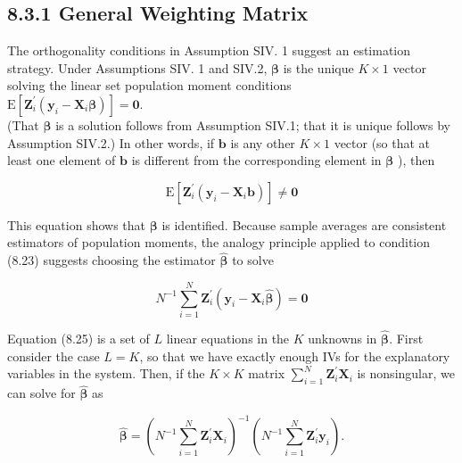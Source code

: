 \documentclass[10pt]{article}
\begin{document}
\subsection*{8.3.1 General Weighting Matrix}
The orthogonality conditions in Assumption SIV. 1 suggest an estimation strategy. Under Assumptions SIV. 1 and SIV.2, $\boldsymbol{\beta}$ is the unique $K \times 1$ vector solving the linear set population moment conditions\\
$\mathrm{E}\left[\mathbf{Z}_{i}^{\prime}\left(\mathbf{y}_{i}-\mathbf{X}_{i} \boldsymbol{\beta}\right)\right]=\mathbf{0}$.\\
(That $\boldsymbol{\beta}$ is a solution follows from Assumption SIV.1; that it is unique follows by Assumption SIV.2.) In other words, if $\mathbf{b}$ is any other $K \times 1$ vector (so that at least one element of $\mathbf{b}$ is different from the corresponding element in $\boldsymbol{\beta}$ ), then


\begin{equation*}
\mathrm{E}\left[\mathbf{Z}_{i}^{\prime}\left(\mathbf{y}_{i}-\mathbf{X}_{i} \mathbf{b}\right)\right] \neq \mathbf{0} \tag{8.24}
\end{equation*}


This equation shows that $\boldsymbol{\beta}$ is identified. Because sample averages are consistent estimators of population moments, the analogy principle applied to condition (8.23) suggests choosing the estimator $\hat{\boldsymbol{\beta}}$ to solve


\begin{equation*}
N^{-1} \sum_{i=1}^{N} \mathbf{Z}_{i}^{\prime}\left(\mathbf{y}_{i}-\mathbf{X}_{i} \hat{\boldsymbol{\beta}}\right)=\mathbf{0} \tag{8.25}
\end{equation*}


Equation (8.25) is a set of $L$ linear equations in the $K$ unknowns in $\hat{\boldsymbol{\beta}}$. First consider the case $L=K$, so that we have exactly enough IVs for the explanatory variables in the system. Then, if the $K \times K$ matrix $\sum_{i=1}^{N} \mathbf{Z}_{i}^{\prime} \mathbf{X}_{i}$ is nonsingular, we can solve for $\hat{\boldsymbol{\beta}}$ as


\begin{equation*}
\hat{\boldsymbol{\beta}}=\left(N^{-1} \sum_{i=1}^{N} \mathbf{Z}_{i}^{\prime} \mathbf{X}_{i}\right)^{-1}\left(N^{-1} \sum_{i=1}^{N} \mathbf{Z}_{i}^{\prime} \mathbf{y}_{i}\right) . \tag{8.26}
\end{equation*}
\end{document}
